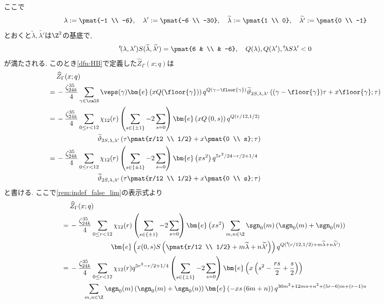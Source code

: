 \documentclass[11pt,b5paper,oneside,lualatex]{ltjsarticle} %
\numberwithin{equation}{section} %
\begin{document}
ここで
\[
\lambda := \pmat{-1 \\ -6}, \quad
\lambda' := \pmat{-6 \\ -30}, \quad
\widetilde{\lambda} := \pmat{1 \\ 0}, \quad
\widetilde{\lambda'} := \pmat{0 \\ -1}
\]
とおくと$ \widetilde{\lambda}, \widetilde{\lambda'} $は$ \Z^2 $の基底で, 
\[
{}^t\!(\lambda, \lambda') S (\widetilde{\lambda}, \widetilde{\lambda'}) = \pmat{6 & \\ & -6}, \quad
Q(\lambda), Q(\lambda'), {}^t\!\lambda S \lambda' < 0
\]
が満たされる. 
このとき\cref{dfn:HB}で定義した$ \widehat{Z}_{\Gamma} (x; q) $は
\begin{align}
	&\widehat{Z}_{\Gamma} (x; q)
	\\
	= \,
	&-\frac{\zeta_{24k}^{35}}{4} 
	\sum_{\gamma \in \calS} 
	\veps(\gamma)
	\bm{e} \left( x Q(\floor{\gamma}) \right) q^{Q(\gamma - \floor{\gamma})}
	\widetilde{\vartheta}_{2S, \lambda, \lambda'} \left( (\gamma - \floor{\gamma})\tau + x \floor{\gamma}; \tau \right)
	\\
	= \,
	&-\frac{\zeta_{24k}^{35}}{4} 
	\sum_{0 \le r < 12} \chi_{12} (r) 
	\left( \sum_{s \in \{ \pm 1 \}} - 2 \sum_{s = 0} \right)
	\bm{e} \left( x Q \left( 0, s \right) \right) 
	q^{Q(r/12, 1/2)}
	\\
	&\qquad \qquad \qquad
	\widetilde{\vartheta}_{2S, \lambda, \lambda'} \left( \tau \pmat{r/12 \\ 1/2} + x \pmat{0 \\ s}; \tau \right)
	\\
	= \,
	&-\frac{\zeta_{24k}^{35}}{4} 
	\sum_{0 \le r < 12} \chi_{12} (r) 
	\left( \sum_{s \in \{ \pm 1 \}} - 2 \sum_{s = 0} \right)
	\bm{e} \left( x s^2 \right) 
	q^{5r^2/24 - r/2 + 1/4}
	\\
	&\qquad \qquad \qquad
	\widetilde{\vartheta}_{2S, \lambda, \lambda'} \left( \tau \pmat{r/12 \\ 1/2} + x \pmat{0 \\ s}; \tau \right)
\end{align}
と書ける. 
ここで\cref{rem:indef_false_lim}の表示式より
\begin{align}
	&\widehat{Z}_{\Gamma} (x; q)
	\\
	= \,
	&-\frac{\zeta_{24k}^{35}}{4} 
	\sum_{0 \le r < 12} \chi_{12} (r) 
	\left( \sum_{s \in \{ \pm 1 \}} - 2 \sum_{s = 0} \right)
	\bm{e} \left( x s^2 \right) 
	\sum_{m, n \in \Z} \sgn_0(m) \left( \sgn_0(m) + \sgn_0(n) \right) 
	\\
	&\qquad \qquad \qquad
	\bm{e} \left( x(0, s) S \left( \pmat{r/12 \\ 1/2} + m\widetilde{\lambda} + n\widetilde{\lambda'} \right) \right)
	q^{Q({}^t\!(r/12, 1/2) + m\widetilde{\lambda} + n\widetilde{\lambda'})}
	\\
	= \,
	&-\frac{\zeta_{24k}^{35}}{4} 
	\sum_{0 \le r < 12} \chi_{12} (r) q^{5r^2 - r/2 + 1/4}
	\left( \sum_{s \in \{ \pm 1 \}} - 2 \sum_{s = 0} \right)
	\bm{e} \left( x \left( s^2 - \frac{rs}{2} + \frac{s}{2} \right) \right)
	\\
	&\qquad 
	\sum_{m, n \in \Z} \sgn_0(m) \left( \sgn_0(m) + \sgn_0(n) \right) 
	\bm{e} \left( -xs \left( 6m + n \right) \right)
	q^{30m^2 + 12mn + n^2 + (5r - 6)m + (r-1)n}
\end{align}
\end{document}
